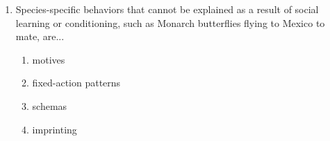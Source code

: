 \documentclass[12pt]{article}
\begin{document}
\begin{enumerate}[label=\arabic*.]
\begin{enumerate}[label=(\alph*)]
    \item performing a task and receiving a food reward
    \item nausea and food or drink
    \item movement and shock
    \item punishments and rewards
\end{enumerate}
\item Species-specific behaviors that cannot be explained as a result of social learning or conditioning, such as Monarch butterflies flying to Mexico to mate, are...
\begin{enumerate}[label=(\alph*)]
    \item motives
    \item fixed-action patterns
    \item schemas
    \item imprinting
\end{enumerate}
\end{enumerate}
\end{document}
